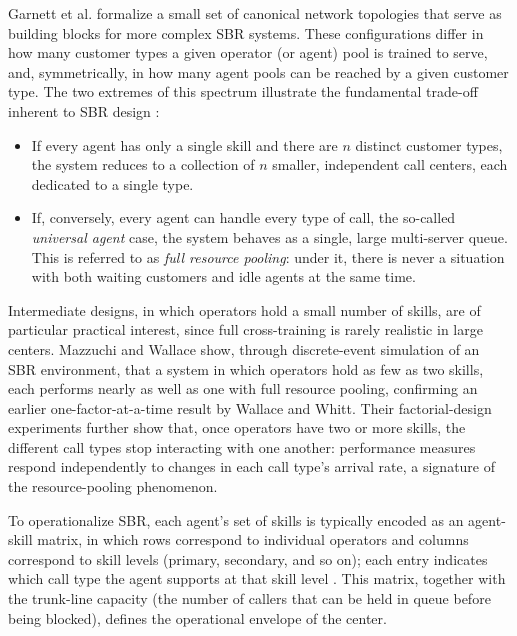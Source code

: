 \documentclass[12pt,a4paper,openright,twoside]{book}
\begin{document}
Garnett et al. formalize a small set of canonical network topologies
that serve as building blocks for more complex SBR systems.
These configurations differ in how many customer types a given operator (or agent) pool is trained to serve, and,
symmetrically, in how many agent pools can be reached by a given customer type.
The two extremes of this spectrum illustrate the fundamental trade-off inherent to SBR design \cite{mazzuchi2004analyzing, garnett2000introduction}:
\begin{itemize}
    \item If every agent has only a single skill and there are $n$ distinct customer types,
    the system reduces to a collection of $n$ smaller, independent call centers, each dedicated to a single type.
    \item If, conversely, every agent can handle every type of call, the so-called \emph{universal agent} case,
    the system behaves as a single, large multi-server queue. This is referred to as \emph{full resource pooling}:
    under it, there is never a situation with both waiting customers and idle agents at the same time.
\end{itemize}

Intermediate designs, in which operators hold a small number of skills, are of particular practical interest,
since full cross-training is rarely realistic in large centers. Mazzuchi and Wallace \cite{mazzuchi2004analyzing} show,
through discrete-event simulation of an SBR environment, that a system in which operators hold as few as two skills,
each performs nearly as well as one with full resource pooling, confirming an earlier one-factor-at-a-time result by Wallace and Whitt.
Their factorial-design experiments further show that, once operators have two or more skills, the different call types stop interacting
with one another: performance measures respond independently to changes in each call type's arrival rate, a signature of the resource-pooling phenomenon.

To operationalize SBR, each agent's set of skills is typically encoded as an agent-skill matrix,
in which rows correspond to individual operators and columns correspond to skill levels (primary, secondary, and so on);
each entry indicates which call type the agent supports at that skill level \cite{mazzuchi2004analyzing}.
This matrix, together with the trunk-line capacity (the number of callers that can be held in queue before being blocked),
defines the operational envelope of the center.
\end{document}
